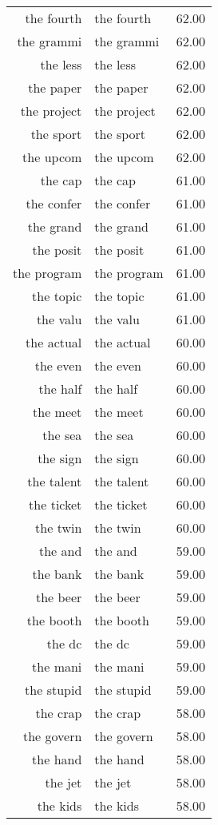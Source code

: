 \begin{table}[ht]
\begin{tabular}{rlr}
  the fourth & the fourth & 62.00 \\ 
  the grammi & the grammi & 62.00 \\ 
  the less & the less & 62.00 \\ 
  the paper & the paper & 62.00 \\ 
  the project & the project & 62.00 \\ 
  the sport & the sport & 62.00 \\ 
  the upcom & the upcom & 62.00 \\ 
  the cap & the cap & 61.00 \\ 
  the confer & the confer & 61.00 \\ 
  the grand & the grand & 61.00 \\ 
  the posit & the posit & 61.00 \\ 
  the program & the program & 61.00 \\ 
  the topic & the topic & 61.00 \\ 
  the valu & the valu & 61.00 \\ 
  the actual & the actual & 60.00 \\ 
  the even & the even & 60.00 \\ 
  the half & the half & 60.00 \\ 
  the meet & the meet & 60.00 \\ 
  the sea & the sea & 60.00 \\ 
  the sign & the sign & 60.00 \\ 
  the talent & the talent & 60.00 \\ 
  the ticket & the ticket & 60.00 \\ 
  the twin & the twin & 60.00 \\ 
  the and & the and & 59.00 \\ 
  the bank & the bank & 59.00 \\ 
  the beer & the beer & 59.00 \\ 
  the booth & the booth & 59.00 \\ 
  the dc & the dc & 59.00 \\ 
  the mani & the mani & 59.00 \\ 
  the stupid & the stupid & 59.00 \\ 
  the crap & the crap & 58.00 \\ 
  the govern & the govern & 58.00 \\ 
  the hand & the hand & 58.00 \\ 
  the jet & the jet & 58.00 \\ 
  the kids & the kids & 58.00 \\ 

\end{tabular}
\end{table}

